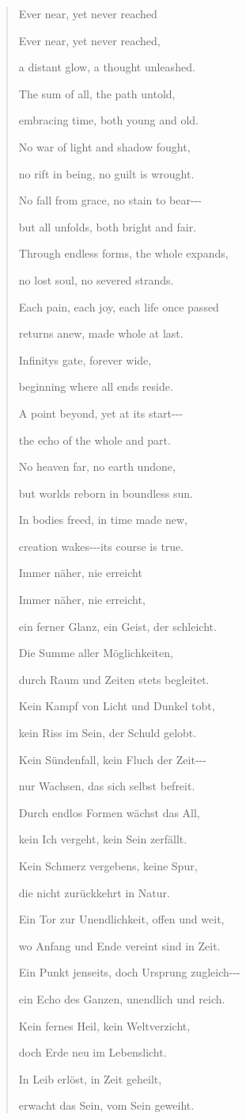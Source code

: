 \documentclass[
  ngerman,
]{article}
\begin{document}
\begin{quote}
Ever near, yet never reached

Ever near, yet never reached,

a distant glow, a thought unleashed.

The sum of all, the path untold,

embracing time, both young and old.

No war of light and shadow fought,

no rift in being, no guilt is wrought.

No fall from grace, no stain to bear-\/-\/-

but all unfolds, both bright and fair.

Through endless forms, the whole expands,

no lost soul, no severed strands.

Each pain, each joy, each life once passed

returns anew, made whole at last.

Infinity\textquotesingle s gate, forever wide,

beginning where all ends reside.

A point beyond, yet at its start-\/-\/-

the echo of the whole and part.

No heaven far, no earth undone,

but worlds reborn in boundless sun.

In bodies freed, in time made new,

creation wakes-\/-\/-its course is true.

Immer näher, nie erreicht

Immer näher, nie erreicht,

ein ferner Glanz, ein Geist, der schleicht.

Die Summe aller Möglichkeiten,

durch Raum und Zeiten stets begleitet.

Kein Kampf von Licht und Dunkel tobt,

kein Riss im Sein, der Schuld gelobt.

Kein Sündenfall, kein Fluch der Zeit-\/-\/-

nur Wachsen, das sich selbst befreit.

Durch endlos Formen wächst das All,

kein Ich vergeht, kein Sein zerfällt.

Kein Schmerz vergebens, keine Spur,

die nicht zurückkehrt in Natur.

Ein Tor zur Unendlichkeit, offen und weit,

wo Anfang und Ende vereint sind in Zeit.

Ein Punkt jenseits, doch Ursprung zugleich-\/-\/-

ein Echo des Ganzen, unendlich und reich.

Kein fernes Heil, kein Weltverzicht,

doch Erde neu im Lebenslicht.

In Leib erlöst, in Zeit geheilt,

erwacht das Sein, vom Sein geweiht.
\end{quote}
\end{document}
